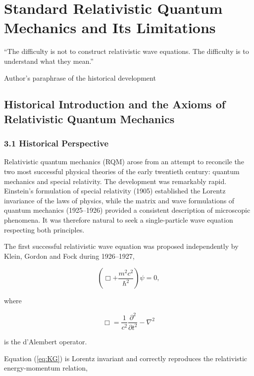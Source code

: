 \chapter{Standard Relativistic Quantum Mechanics and Its Limitations}

\epigraph{
``The difficulty is not to construct relativistic wave equations.
The difficulty is to understand what they mean.''
}{Author's paraphrase of the historical development}

\section{Historical Introduction and the Axioms of Relativistic Quantum Mechanics}

\subsection{3.1 Historical Perspective}

Relativistic quantum mechanics (RQM) arose from an attempt to reconcile the
two most successful physical theories of the early twentieth century:
quantum mechanics and special relativity.  The development was remarkably
rapid. Einstein's formulation of special relativity (1905) established the
Lorentz invariance of the laws of physics, while the matrix and wave
formulations of quantum mechanics (1925--1926) provided a consistent
description of microscopic phenomena. It was therefore natural to seek a
single-particle wave equation respecting both principles.

The first successful relativistic wave equation was proposed independently by
Klein, Gordon and Fock during 1926--1927,

\begin{equation}
\left(
\Box+\frac{m^2c^2}{\hbar^2}
\right)\psi=0,
\label{eq:KG}
\end{equation}

where

\begin{equation}
\Box
=
\frac1{c^2}\frac{\partial^2}{\partial t^2}
-\nabla^2
\end{equation}

is the d'Alembert operator.

Equation (\ref{eq:KG}) is Lorentz invariant and correctly reproduces the
relativistic energy-momentum relation,

